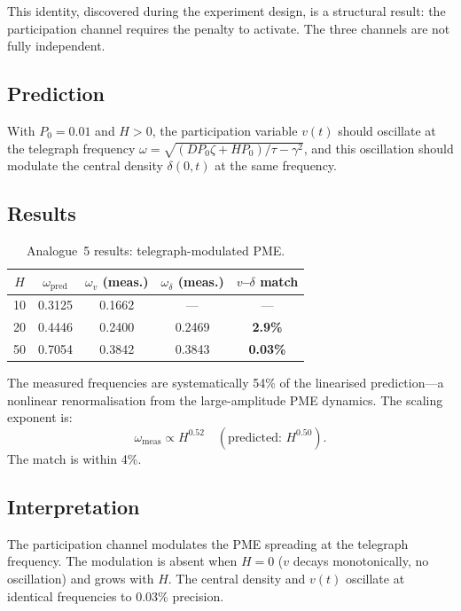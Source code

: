 \documentclass[11pt]{article}
\begin{document}
This identity, discovered during the experiment design, is a structural result: the participation channel requires the penalty to activate. The three channels are not fully independent.

\subsection{Prediction}

With \(P_0 = 0.01\) and \(H > 0\), the participation variable \(v(t)\) should oscillate at the telegraph frequency \(\omega = \sqrt{(DP_0\zeta + HP_0)/\tau - \gamma^2}\), and this oscillation should modulate the central density \(\delta(0,t)\) at the same frequency.

\subsection{Results}

\begin{table}[h]
\centering
\begin{tabular}{@{}ccccc@{}}
\toprule
\(H\) & \(\omega_{\mathrm{pred}}\) & \(\omega_v\) (meas.) & \(\omega_\delta\) (meas.) & \(v\)--\(\delta\) match \\
\midrule
10 & 0.3125 & 0.1662 & --- & --- \\
20 & 0.4446 & 0.2400 & 0.2469 & \textbf{2.9\%} \\
50 & 0.7054 & 0.3842 & 0.3843 & \textbf{0.03\%} \\
\bottomrule
\end{tabular}
\caption{Analogue~5 results: telegraph-modulated PME.}
\label{tab:tpme-results}
\end{table}

The measured frequencies are systematically 54\% of the linearised prediction---a nonlinear renormalisation from the large-amplitude PME dynamics. The scaling exponent is:
\begin{equation}\label{eq:omega-scaling}
  \omega_{\mathrm{meas}} \propto H^{0.52} \quad (\text{predicted: } H^{0.50}).
\end{equation}
The match is within 4\%.

\subsection{Interpretation}

The participation channel modulates the PME spreading at the telegraph frequency. The modulation is absent when \(H = 0\) (\(v\) decays monotonically, no oscillation) and grows with \(H\). The central density and \(v(t)\) oscillate at identical frequencies to 0.03\% precision.
\end{document}
